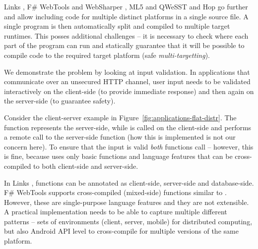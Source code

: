 Links \cite{app-distributed-links}, F\# WebTools and WebSharper \cite{app-fsharp-webapps,app-fsharp-webtools},
ML5 and QWeSST \cite{app-distributed-ml5, app-distributed-qwesst} and Hop \cite{app-hop-lang} go
further and allow including code for multiple distinct platforms in a single source file.
A single program is then automatically split and compiled to multiple target runtimes. This
posses additional challenges -- it is necessary to check where each part of the program can run
and statically guarantee that it will be possible to compile code to the required target
platform (safe \emph{multi-targetting}).

We demonstrate the problem by looking at input validation. In applications that communicate over
an unsecured HTTP channel, user input needs to be validated interactively on the client-side (to
provide immediate response) and then again on the server-side (to guarantee safety).

Consider the client-server example in Figure~\ref{fig:applications-flat-distr}. The
 function represents the server-side, while  is called
on the client-side and performs a remote call to the server-side function (how this is implemented
is not our concern here). To ensure that the input is valid \emph{both} functions call
 -- however, this is fine, because  uses only basic
functions and language features that can be cross-compiled to both client-side and server-side.

In Links \cite{app-distributed-links}, functions can be annotated as client-side, server-side
and database-side. F\# WebTools \cite{app-fsharp-webtools} supports cross-compiled (mixed-side)
functions similar to . However, these are single-purpose language features
and they are not extensible. A practical implementation needs to be able to capture multiple
different patterns -- sets of environments (client, server, mobile) for distributed computing,
but also Android API level \cite{app-android-multitarget} to cross-compile for multiple versions
of the same platform.


